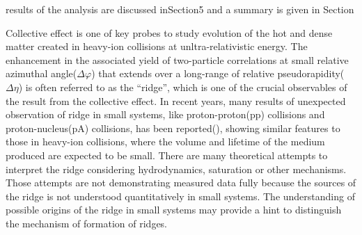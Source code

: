 \documentclass[ALICE,manyauthors]{cernphprep}
\begin{document}
results of the analysis are discussed inSection5 and a summary is given in Section


Collective effect is one of key probes to study evolution of the hot and dense matter created in heavy-ion collisions at unltra-relativistic energy. The enhancement in the associated yield of two-particle correlations at small relative azimuthal angle($\Delta\varphi$) that extends over a long-range of relative pseudorapidity($\Delta\eta$) is often referred to as the “ridge”, which is one of the crucial observables of the result from the collective effect\cite{ridge_aa_1, ridge_aa_2}. In recent years, many results of unexpected observation of ridge in small systems, like proton-proton(pp) collisions and proton-nucleus(pA) collisions, has been reported(\cite{ridge_pp_1, ridge_pp_2, ridge_pp_3, ridge_pp_4}), showing similar features to those in heavy-ion collisions, where the volume and lifetime of the medium produced are expected to be small. There are many theoretical attempts\cite{ridge_theory_1, ridge_theory_2, ridge_theory_3, ridge_theory_4} to interpret the ridge considering hydrodynamics, saturation or other mechanisms. Those attempts are not demonstrating measured data fully because the sources of the ridge is not understood quantitatively in small systems. The understanding of possible origins of the ridge in small systems may provide a hint to distinguish the mechanism of formation of ridges.


\end{document}
